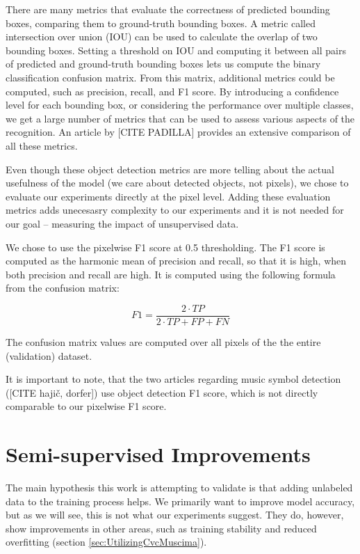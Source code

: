 There are many metrics that evaluate the correctness of predicted bounding boxes, comparing them to ground-truth bounding boxes. A metric called intersection over union (IOU) can be used to calculate the overlap of two bounding boxes. Setting a threshold on IOU and computing it between all pairs of predicted and ground-truth bounding boxes lets us compute the binary classification confusion matrix. From this matrix, additional metrics could be computed, such as precision, recall, and F1 score. By introducing a confidence level for each bounding box, or considering the performance over multiple classes, we get a large number of metrics that can be used to assess various aspects of the recognition. An article by [CITE PADILLA] provides an extensive comparison of all these metrics.

Even though these object detection metrics are more telling about the actual usefulness of the model (we care about detected objects, not pixels), we chose to evaluate our experiments directly at the pixel level. Adding these evaluation metrics adds unecesasry complexity to our experiments and it is not needed for our goal -- measuring the impact of unsupervised data.

We chose to use the pixelwise F1 score at 0.5 thresholding. The F1 score is computed as the harmonic mean of precision and recall, so that it is high, when both precision and recall are high. It is computed using the following formula from the confusion matrix:

$$
    F1 = \frac{2 \cdot TP}{2 \cdot TP + FP + FN}
$$

The confusion matrix values are computed over all pixels of the the entire (validation) dataset.

It is important to note, that the two articles regarding music symbol detection ([CITE hajič, dorfer]) use object detection F1 score, which is not directly comparable to our pixelwise F1 score.


\section{Semi-supervised Improvements}
\label{sec:SemisupervisedImprovements}

The main hypothesis this work is attempting to validate is that adding unlabeled data to the training process helps. We primarily want to improve model accuracy, but as we will see, this is not what our experiments suggest. They do, however, show improvements in other areas, such as training stability and reduced overfitting (section \ref{sec:UtilizingCvcMuscima}).

